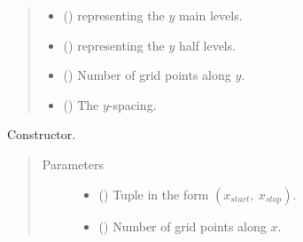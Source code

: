 \documentclass[letterpaper,10pt,english]{sphinxmanual}
\begin{document}
\begin{fulllineitems}
\begin{quote}
\begin{description}
\begin{itemize}
\item {} 
{\hyperref[\detokenize{api:grids.grid_xyz.GridXYZ.y}]{}} () \textendash{} {\hyperref[\detokenize{api:grids.axis.Axis}]{}} representing the \(y\) main levels.

\item {} 
{\hyperref[\detokenize{api:grids.grid_xyz.GridXYZ.y_half_levels}]{}} () \textendash{} {\hyperref[\detokenize{api:grids.axis.Axis}]{}} representing the \(y\) half levels.

\item {} 
{\hyperref[\detokenize{api:grids.grid_xyz.GridXYZ.ny}]{}} () \textendash{} Number of grid points along \(y\).

\item {} 
{\hyperref[\detokenize{api:grids.grid_xyz.GridXYZ.dy}]{}} () \textendash{} The \(y\)-spacing.

\end{itemize}

\end{description}\end{quote}

\begin{fulllineitems}
\label{\detokenize{api:grids.grid_xy.GridXY.__init__}}
Constructor.
\begin{quote}\begin{description}
\item[{Parameters}] \leavevmode\begin{itemize}
\item {} 
 () \textendash{} Tuple in the form \((x_{start}, ~ x_{stop})\).

\item {} 
 () \textendash{} Number of grid points along \(x\).


\end{itemize}
\end{description}
\end{quote}
\end{fulllineitems}
\end{fulllineitems}
\end{document}

